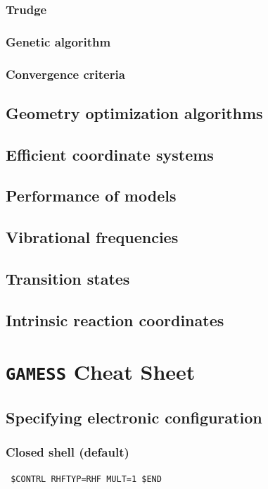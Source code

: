 \documentclass[11pt]{article}
\begin{document}
\subsubsection{Trudge}
\label{sec-6-4-5}
\subsubsection{Genetic algorithm}
\label{sec-6-4-6}
\subsubsection{Convergence criteria}
\label{sec-6-4-7}

\subsection{Geometry optimization algorithms}
\label{sec-6-5}

\subsection{Efficient coordinate systems}
\label{sec-6-6}
\subsection{Performance of models}
\label{sec-6-7}
\subsection{Vibrational frequencies}
\label{sec-6-8}
\subsection{Transition states}
\label{sec-6-9}
\subsection{Intrinsic reaction coordinates}
\label{sec-6-10}
\newpage


\section{\texttt{GAMESS} Cheat Sheet}
\label{sec-7}
\subsection{Specifying electronic configuration}
\label{sec-7-1}
\subsubsection{Closed shell (default)}
\label{sec-7-1-1}
\begin{verbatim}
 $CONTRL RHFTYP=RHF MULT=1 $END
\end{verbatim}
\end{document}
